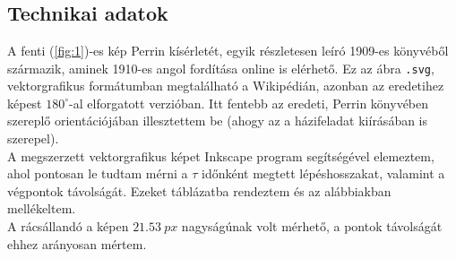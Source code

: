 \section{} \label{sec:2}
\subsection{Technikai adatok}
A fenti (\ref{fig:1})-es kép Perrin kísérletét, egyik részletesen leíró 1909-es könyvéből származik\cite{perrin1909mouvement}, aminek 1910-es angol fordítása online is elérhető\cite{perrin1910brownian}. Ez az ábra \texttt{.svg}, vektorgrafikus formátumban megtalálható a Wikipédián\cite{perrinwiki}, azonban az eredetihez képest $180^{\circ}$-al elforgatott verzióban. Itt fentebb az eredeti, Perrin könyvében szereplő orientációjában illesztettem be (ahogy az a házifeladat kiírásában is szerepel). \\
A megszerzett vektorgrafikus képet Inkscape program segítségével elemeztem, ahol pontosan le tudtam mérni a $\tau$ időnként megtett lépéshosszakat, valamint a végpontok távolságát. Ezeket táblázatba rendeztem és az alábbiakban mellékeltem. \\
A rácsállandó a képen $21.53\ px$ nagyságúnak volt mérhető, a pontok távolságát ehhez arányosan mértem.

